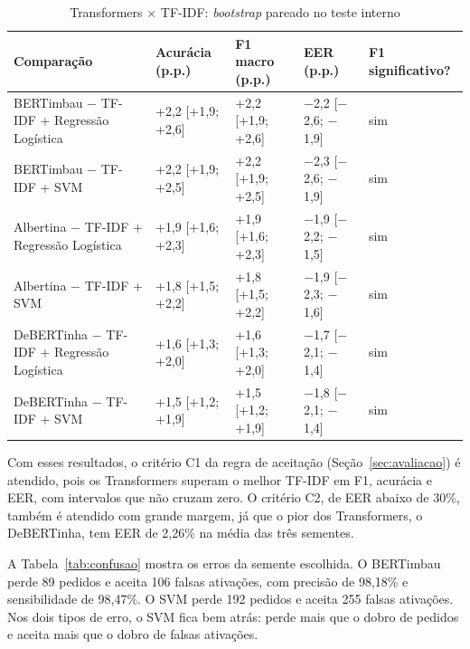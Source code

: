 \documentclass[
    12pt,                %
    openright,           %
    oneside,             %
    a4paper,             %
    english,             %
    brazil               %
]{abntex2}
\begin{document}
\begin{table}[htb]
\centering
\caption{Transformers $\times$ TF-IDF: \textit{bootstrap} pareado no teste interno}
\label{tab:bootstrap}
\small
\begin{tabularx}{\textwidth}{ZZZZZ}
\toprule
Comparação & Acurácia (p.p.) & F1 macro (p.p.) & EER (p.p.) & F1 significativo? \\
\midrule
BERTimbau $-$ TF-IDF + Regressão Logística & +2,2 [+1,9; +2,6] & +2,2 [+1,9; +2,6] & $-$2,2 [$-$2,6; $-$1,9] & sim \\
BERTimbau $-$ TF-IDF + SVM & +2,2 [+1,9; +2,5] & +2,2 [+1,9; +2,5] & $-$2,3 [$-$2,6; $-$1,9] & sim \\
Albertina $-$ TF-IDF + Regressão Logística & +1,9 [+1,6; +2,3] & +1,9 [+1,6; +2,3] & $-$1,9 [$-$2,2; $-$1,5] & sim \\
Albertina $-$ TF-IDF + SVM & +1,8 [+1,5; +2,2] & +1,8 [+1,5; +2,2] & $-$1,9 [$-$2,3; $-$1,6] & sim \\
DeBERTinha $-$ TF-IDF + Regressão Logística & +1,6 [+1,3; +2,0] & +1,6 [+1,3; +2,0] & $-$1,7 [$-$2,1; $-$1,4] & sim \\
DeBERTinha $-$ TF-IDF + SVM & +1,5 [+1,2; +1,9] & +1,5 [+1,2; +1,9] & $-$1,8 [$-$2,1; $-$1,4] & sim \\
\bottomrule
\end{tabularx}
\end{table}

Com esses resultados, o critério C1 da regra de aceitação (Seção~\ref{sec:avaliacao}) é atendido, pois os Transformers superam o melhor TF-IDF em F1, acurácia e EER, com intervalos que não cruzam zero. O critério C2, de EER abaixo de 30\%, também é atendido com grande margem, já que o pior dos Transformers, o DeBERTinha, tem EER de 2,26\% na média das três sementes.

A Tabela~\ref{tab:confusao} mostra os erros da semente escolhida. O BERTimbau perde 89 pedidos e aceita 106 falsas ativações, com precisão de 98,18\% e sensibilidade de 98,47\%. O SVM perde 192 pedidos e aceita 255 falsas ativações. Nos dois tipos de erro, o SVM fica bem atrás: perde mais que o dobro de pedidos e aceita mais que o dobro de falsas ativações.
\end{document}
